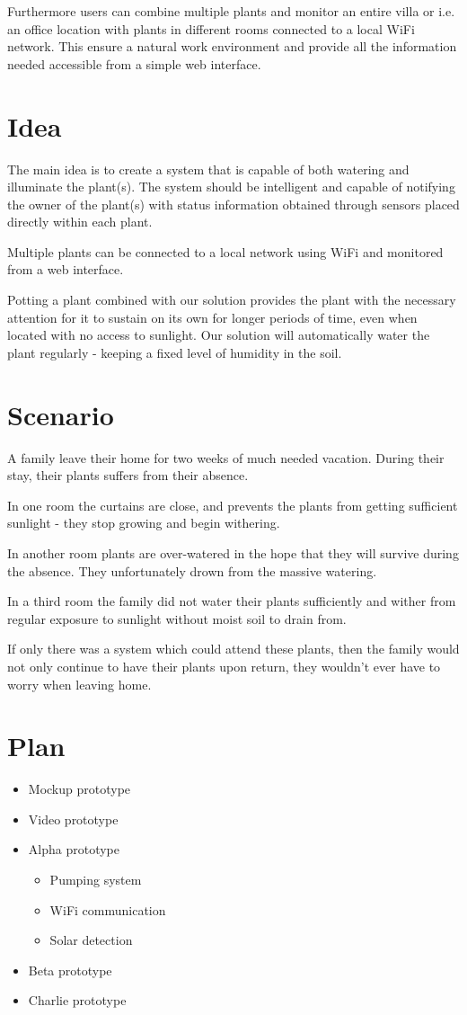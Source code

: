 \documentclass{ubicomp2012}
\begin{document}
Furthermore users can combine multiple plants and monitor an entire villa or i.e. an office location with plants in different rooms connected to a local WiFi network. This ensure a natural work environment and provide all the information needed accessible from a simple web interface.

\section{Idea}
The main idea is to create a system that is capable of both watering and illuminate the plant(s). The system should be intelligent and capable of notifying the owner of the plant(s) with status information obtained through sensors placed directly within each plant.

Multiple plants can be connected to a local network using WiFi and monitored from a web interface.

Potting a plant combined with our solution provides the plant with the necessary attention for it to sustain on its own for longer periods of time, even when located with no access to sunlight. Our solution will automatically water the plant regularly - keeping a fixed level of humidity in the soil.

\section{Scenario}
A family leave their home for two weeks of much needed vacation. During their stay, their plants suffers from their absence.

In one room the curtains are close, and prevents the plants from getting sufficient sunlight - they stop growing and begin withering.

In another room plants are over-watered in the hope that they will survive during the absence. They unfortunately drown from the massive watering.

In a third room the family did not water their plants sufficiently and wither from regular exposure to sunlight without moist soil to drain from.

If only there was a system which could attend these plants, then the family would not only continue to have their plants upon return, they wouldn't ever have to worry when leaving home.

\section{Plan}
\begin{itemize}
\item Mockup prototype
\item Video prototype
\item Alpha prototype
\begin{itemize}
\item Pumping system
\item WiFi communication
\item Solar detection
\end{itemize}
\item Beta prototype
\item Charlie prototype
\end{itemize}
 
\end{document}
